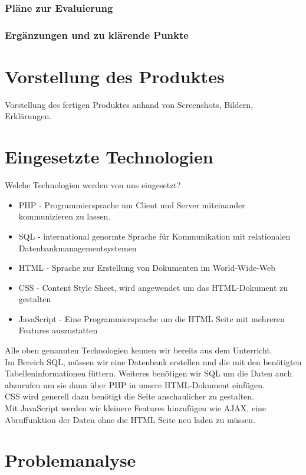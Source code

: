 \subsection{Pläne zur Evaluierung}
\subsection{Ergänzungen und zu klärende Punkte}

\chapter{Vorstellung des Produktes}
Vorstellung des fertigen Produktes anhand von Screenshots, Bildern, Erklärungen.

\chapter{Eingesetzte Technologien}
Welche Technologien werden von uns eingesetzt?
\begin{itemize}
	
	\item PHP - Programmiersprache um Client und Server miteinander kommunizieren zu lassen.
	\item SQL - international genormte Sprache für Kommunikation mit relationalen Datenbankmanagementsystemen
	\item HTML - Sprache zur Erstellung von Dokumenten im World-Wide-Web
	\item CSS - Content Style Sheet, wird angewendet um das HTML-Dokument zu gestalten
	\item JavaScript - Eine Programmiersprache um die HTML Seite mit mehreren Features auszustatten
\end{itemize}

Alle oben genannten Technologien kennen wir bereits aus dem Unterricht.\\
Im Bereich SQL, müssen wir eine Datenbank erstellen und die mit den benötigten Tabelleninformationen füttern. Weiteres benötigen wir SQL um die Daten auch abzurufen um sie dann über PHP in unsere HTML-Dokument einfügen.\\
CSS wird generell dazu benötigt die Seite anschaulicher zu gestalten.\\
Mit JavaScript werden wir kleinere Features hinzufügen wie AJAX, eine Abruffunktion der Daten ohne die HTML Seite neu laden zu müssen.\\



\chapter{Problemanalyse}
